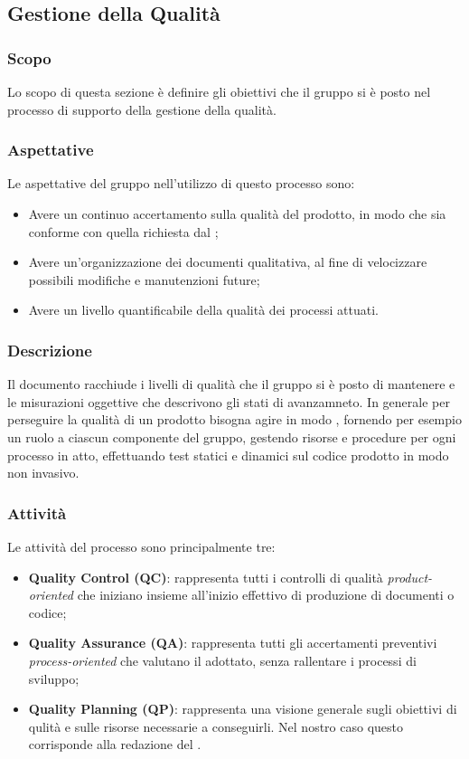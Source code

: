 \subsection{Gestione della Qualità}
\subsubsection{Scopo}
Lo scopo di questa sezione è definire gli obiettivi che il gruppo si è posto nel processo di supporto della gestione della qualità. 

\subsubsection{Aspettative}
Le aspettative del gruppo \Gruppo{} nell'utilizzo di questo processo sono:
\begin{itemize}
	\item Avere un continuo accertamento sulla qualità del prodotto, in modo che sia conforme con quella richiesta dal ;
	\item Avere un'organizzazione dei documenti qualitativa, al fine di velocizzare possibili modifiche e manutenzioni future;
	\item Avere un livello quantificabile della qualità dei processi attuati.
\end{itemize}

\subsubsection{Descrizione}
Il documento \PdQ racchiude i livelli di qualità che il gruppo si è posto di mantenere e le misurazioni oggettive che descrivono gli stati di avanzamneto.
In generale per perseguire la qualità di un prodotto bisogna agire in modo , fornendo per esempio un ruolo a ciascun componente del gruppo, gestendo risorse e procedure per ogni processo in atto, effettuando test statici e dinamici sul codice prodotto in modo non invasivo.

\subsubsection{Attività}
Le attività del processo sono principalmente tre:
\begin{itemize}
	\item \textbf{Quality Control (QC)}: rappresenta tutti i controlli di qualità \textit{product-oriented} che iniziano insieme all'inizio effettivo di produzione di documenti o codice;
	\item \textbf{Quality Assurance (QA)}: rappresenta tutti gli accertamenti preventivi \textit{process-oriented} che valutano il  adottato, senza rallentare i processi di sviluppo;
	\item \textbf{Quality Planning (QP)}: rappresenta una visione generale sugli obiettivi di qulità e sulle risorse necessarie a conseguirli. Nel nostro caso questo corrisponde alla redazione del \PdQv{}.
\end{itemize}
	
